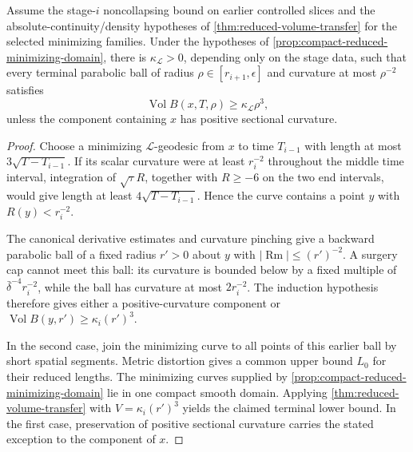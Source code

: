 \begin{lemma}
\label{lem:reduced-volume-noncollapsing-transfer}
\notready
Assume the stage-$i$ noncollapsing bound on earlier controlled slices and the
absolute-continuity/density hypotheses of \ref{thm:reduced-volume-transfer}
for the selected minimizing families.  Under the hypotheses of
\ref{prop:compact-reduced-minimizing-domain}, there is
$\kappa_{\mathcal L}>0$, depending only on the stage data, such that every
terminal parabolic ball of radius
$\rho\in[r_{i+1},\epsilon]$ and curvature at most $\rho^{-2}$ satisfies
\[
 \operatorname{Vol}B(x,T,\rho)\ge\kappa_{\mathcal L}\rho^3,
\]
unless the component containing $x$ has positive sectional curvature.
\end{lemma}

\begin{proof}
Choose a minimizing $\mathcal L$-geodesic from $x$ to time $T_{i-1}$ with
length at most $3\sqrt{T-T_{i-1}}$.  If its scalar curvature were at least
$r_i^{-2}$ throughout the middle time interval, integration of
$\sqrt\tau R$, together with $R\ge-6$ on the two end intervals, would give
length at least $4\sqrt{T-T_{i-1}}$.  Hence the curve contains a point $y$
with $R(y)<r_i^{-2}$.

The canonical derivative estimates and curvature pinching give a backward
parabolic ball of a fixed radius $r'>0$ about $y$ with
$|\operatorname{Rm}|\le(r')^{-2}$.  A surgery cap cannot meet this ball:
its curvature is bounded below by a fixed multiple of
$\bar\delta^{-4}r_i^{-2}$, while the ball has curvature at most
$2r_i^{-2}$.  The induction hypothesis therefore gives either a
positive-curvature component or
$\operatorname{Vol}B(y,r')\ge\kappa_i(r')^3$.

In the second case, join the minimizing curve to all points of this earlier
ball by short spatial segments.  Metric distortion gives a common upper
bound $L_0$ for their reduced lengths.  The minimizing curves supplied by
\ref{prop:compact-reduced-minimizing-domain} lie in one compact smooth
domain.  Applying \ref{thm:reduced-volume-transfer} with
$V=\kappa_i(r')^3$ yields the claimed terminal lower bound.  In the first
case, preservation of positive sectional curvature carries the stated
exception to the component of $x$.
\end{proof}

